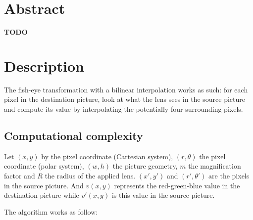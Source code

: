 \documentclass[10pt,a4paper]{article}
\begin{document}
\maketitle

\section{Abstract}
\textbf{TODO}

\section{Description}

The fish-eye transformation with a bilinear interpolation works as such: for
each pixel in the destination picture, look at what the lens sees in the
source picture and compute its value by interpolating the potentially four
surrounding pixels.

\subsection{Computational complexity}

Let $(x, y)$ by the pixel coordinate (Cartesian system), $(r, \theta)$ the
pixel coordinate (polar system), $(w, h)$ the picture geometry, $m$ the
magnification factor and $R$ the radius of the applied lens. $(x\prime,
y\prime)$ and $(r\prime, \theta\prime)$ are the pixels in the source picture.
And $v(x,y)$ represents the red-green-blue value in the destination picture
while $v\prime(x,y)$ is this value in the source picture.

The algorithm works as follow:
\end{document}
